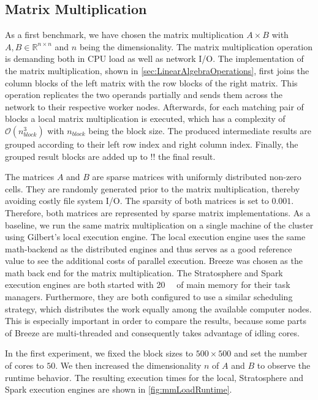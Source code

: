 \subsection{Matrix Multiplication}
\label{subsec:mm}

As a first benchmark, we have chosen the matrix multiplication $A\times B$ with $A,B \in \mathbb{R}^{n\times n}$ and $n$ being the dimensionality.
The matrix multiplication operation is demanding both in CPU load as well as network I/O.
The implementation of the matrix multiplication, shown in \cref{sec:LinearAlgebraOperations}, first joins the column blocks of the left matrix with the row blocks of the right matrix.
This operation replicates the two operands partially and sends them across the network to their respective worker nodes.
Afterwards, for each matching pair of blocks a local matrix multiplication is executed, which has a complexity of $\mathcal{O}(n_{block}^3)$ with $n_{block}$ being the block size.
The produced intermediate results are grouped according to their left row index and right column index.
Finally, the grouped result blocks are added up to !! the final result.

The matrices $A$ and $B$ are sparse matrices with uniformly distributed non-zero cells.
They are randomly generated prior to the matrix multiplication, thereby avoiding costly file system I/O.
The sparsity of both matrices is set to $0.001$.
Therefore, both matrices are represented by sparse matrix implementations.
As a baseline, we run the same matrix multiplication on a single machine of the cluster using Gilbert's local execution engine.
The local execution engine uses the same math-backend as the distributed engines and thus serves as a good reference value to see the additional costs of parallel execution.
Breeze was chosen as the math back end for the matrix multiplication.
The Stratosphere and Spark execution engines are both started with \SI{20}{\giga\byte} of main memory for their task managers.
Furthermore, they are both configured to use a similar scheduling strategy, which distributes the work equally among the available computer nodes.
This is especially important in order to compare the results, because some parts of Breeze are multi-threaded and consequently takes advantage of idling cores.

In the first experiment, we fixed the block sizes to $500 \times 500$ and set the number of cores to $50$.
We then increased the dimensionality $n$ of $A$ and $B$ to observe the runtime behavior.
The resulting execution times for the local, Stratosphere and Spark execution engines are shown in \cref{fig:mmLoadRuntime}.


